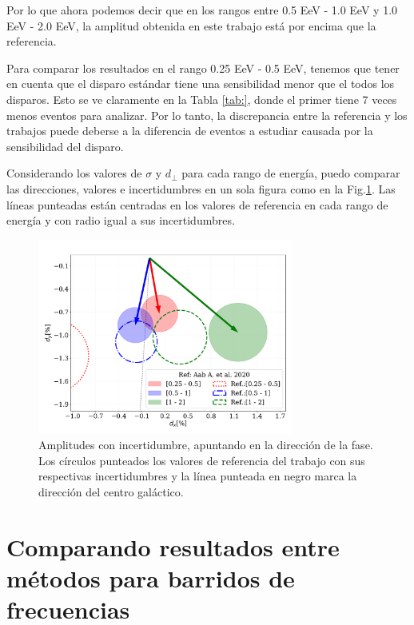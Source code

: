 Por lo que ahora podemos decir que en los rangos entre 0.5 EeV - 1.0 EeV y 1.0 EeV - 2.0 EeV, la amplitud obtenida en este trabajo está por encima que la referencia. 

Para comparar los resultados en el  rango 0.25 EeV - 0.5 EeV, tenemos que tener en cuenta que el disparo estándar tiene una sensibilidad menor que el todos los disparos. Esto se ve claramente en la Tabla \ref{tab:}, donde el primer tiene 7 veces menos eventos para analizar. Por lo tanto, la discrepancia entre la referencia y los trabajos puede deberse a la  diferencia de eventos a estudiar causada por la sensibilidad del disparo.


Considerando los valores de $\sigma$ y $d_\perp$ para cada rango de energía, puedo comparar las direcciones, valores e incertidumbres en un sola figura como en la Fig.\ref{fig:incertidumbre}. Las líneas punteadas están centradas en los valores de referencia en cada rango de energía y con radio igual a sus incertidumbres. 

\begin{figure}[H]
    \begin{small}
        \begin{center}
            \includegraphics[width=0.75\textwidth]{comparando_sigmas_v2.pdf}
        \end{center}
        \caption{Amplitudes con incertidumbre, apuntando en la dirección  de la fase. Los círculos punteados los valores de referencia del trabajo \cite{Aab_2020} con sus respectivas incertidumbres y la línea punteada en negro marca la dirección del centro galáctico.}
        \label{fig:incertidumbre}
    \end{small}
\end{figure}


\section{Comparando resultados entre métodos para barridos de frecuencias}

